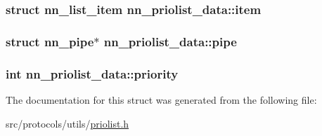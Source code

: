 \subsubsection[{item}]{\setlength{\rightskip}{0pt plus 5cm}struct {\bf nn\+\_\+list\+\_\+item} nn\+\_\+priolist\+\_\+data\+::item}\hypertarget{structnn__priolist__data_ab5bead9bec69415ce75552478dba8af2}{}\label{structnn__priolist__data_ab5bead9bec69415ce75552478dba8af2}
\subsubsection[{pipe}]{\setlength{\rightskip}{0pt plus 5cm}struct nn\+\_\+pipe$\ast$ nn\+\_\+priolist\+\_\+data\+::pipe}\hypertarget{structnn__priolist__data_ac38c3895992700941b876c2410e01f19}{}\label{structnn__priolist__data_ac38c3895992700941b876c2410e01f19}
\subsubsection[{priority}]{\setlength{\rightskip}{0pt plus 5cm}int nn\+\_\+priolist\+\_\+data\+::priority}\hypertarget{structnn__priolist__data_a2709d2e03071e27936dd1cb73aed3dbc}{}\label{structnn__priolist__data_a2709d2e03071e27936dd1cb73aed3dbc}


The documentation for this struct was generated from the following file\+:\begin{DoxyCompactItemize}
\item 
src/protocols/utils/\hyperlink{priolist_8h}{priolist.\+h}\end{DoxyCompactItemize}
